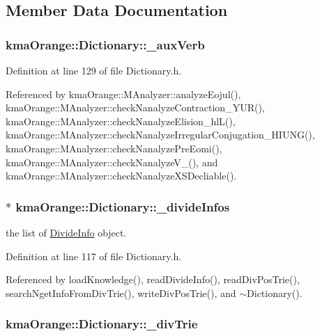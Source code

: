 \subsection{Member Data Documentation}
\hypertarget{classkmaOrange_1_1Dictionary_7c7dd61a304ffc8fb6e66dd5eb0589da}{
\subsubsection[{\_\-auxVerb}]{ {\bf kmaOrange::Dictionary::\_\-auxVerb}}}
\label{classkmaOrange_1_1Dictionary_7c7dd61a304ffc8fb6e66dd5eb0589da}




Definition at line 129 of file Dictionary.h.

Referenced by kmaOrange::MAnalyzer::analyzeEojul(), kmaOrange::MAnalyzer::checkNanalyzeContraction\_\-YUR(), kmaOrange::MAnalyzer::checkNanalyzeElision\_\-hlL(), kmaOrange::MAnalyzer::checkNanalyzeIrregularConjugation\_\-HIUNG(), kmaOrange::MAnalyzer::checkNanalyzePreEomi(), kmaOrange::MAnalyzer::checkNanalyzeV\_\-(), and kmaOrange::MAnalyzer::checkNanalyzeXSDecliable().\hypertarget{classkmaOrange_1_1Dictionary_eebf34672a311605acc6354875282b0b}{
\subsubsection[{\_\-divideInfos}]{$\ast$ {\bf kmaOrange::Dictionary::\_\-divideInfos}}}
\label{classkmaOrange_1_1Dictionary_eebf34672a311605acc6354875282b0b}


the list of \hyperlink{classDivideInfo}{DivideInfo} object. 



Definition at line 117 of file Dictionary.h.

Referenced by loadKnowledge(), readDivideInfo(), readDivPosTrie(), searchNgetInfoFromDivTrie(), writeDivPosTrie(), and $\sim$Dictionary().\hypertarget{classkmaOrange_1_1Dictionary_44cf3309fd7c7bbefa394ac6bc78fe56}{
\subsubsection[{\_\-divTrie}]{ {\bf kmaOrange::Dictionary::\_\-divTrie}}}
\label{classkmaOrange_1_1Dictionary_44cf3309fd7c7bbefa394ac6bc78fe56}


